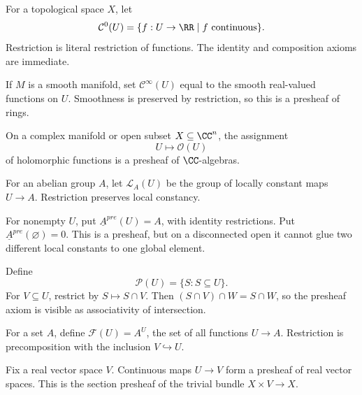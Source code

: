 \begin{example}
For a topological space $X$, let
\[
\mathcal C^0(U)=\{f:U\to\RR\mid f\text{ continuous}\}.
\]
Restriction is literal restriction of functions.  The identity and composition axioms are
immediate.
\end{example}

\begin{example}
If $M$ is a smooth manifold, set $\mathcal C^\infty(U)$ equal to the smooth real-valued
functions on $U$.  Smoothness is preserved by restriction, so this is a presheaf of rings.
\end{example}

\begin{example}
On a complex manifold or open subset $X\subseteq\CC^n$, the assignment
\[
U\longmapsto\mathcal O(U)
\]
of holomorphic functions is a presheaf of $\CC$-algebras.
\end{example}

\begin{example}
For an abelian group $A$, let $\mathcal L_A(U)$ be the group of locally constant maps
$U\to A$.  Restriction preserves local constancy.
\end{example}

\begin{example}
For nonempty $U$, put $\underline A^{pre}(U)=A$, with identity restrictions.  Put
$\underline A^{pre}(\varnothing)=0$.  This is a presheaf, but on a disconnected open it
cannot glue two different local constants to one global element.
\end{example}

\begin{example}
Define
\[
\mathcal P(U)=\{S:S\subseteq U\}.
\]
For $V\subseteq U$, restrict by $S\mapsto S\cap V$.  Then
$(S\cap V)\cap W=S\cap W$, so the presheaf axiom is visible as associativity of intersection.
\end{example}

\begin{example}
For a set $A$, define $\mathcal F(U)=A^U$, the set of all functions $U\to A$.  Restriction is
precomposition with the inclusion $V\hookrightarrow U$.
\end{example}

\begin{example}
Fix a real vector space $V$.  Continuous maps $U\to V$ form a presheaf of real vector spaces.
This is the section presheaf of the trivial bundle $X\times V\to X$.
\end{example}

